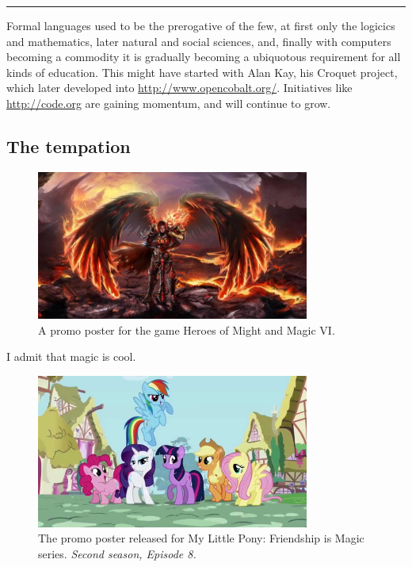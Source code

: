 \documentclass[11pt]{article}
\begin{document}
\noindent\rule{\textwidth}{0.5pt}

Formal languages used to be the prerogative of the few, at first only the
logicics and mathematics, later natural and social sciences, and, finally
with computers becoming a commodity it is gradually becoming a ubiquotous
requirement for all kinds of education.  This might have started with Alan
Kay, his Croquet project, which later developed into
\url{http://www.opencobalt.org/}.  Initiatives like \url{http://code.org} are gaining
momentum, and will continue to grow.
\subsection{The tempation}
\label{sec-1-2}

\begin{figure}[h!]
  \centering
  \includegraphics[width=0.8\textwidth]{./Might-and-Magic-Heroes-VI-Angel.jpg}
  \caption[HOMM VI promo poster]{
    \ssmall A promo poster for the game Heroes of Might and Magic VI.}
\end{figure}

I admit that magic is cool.

\begin{figure}[h!]
  \centering
  \includegraphics[width=0.8\textwidth]{./mlp.jpg}
  \caption[MLP season 2 episode 8]{
    \ssmall The promo poster released for My Little Pony: 
    Friendship is Magic series.
    \textit{Second season, Episode 8.}}
\end{figure}
\end{document}

